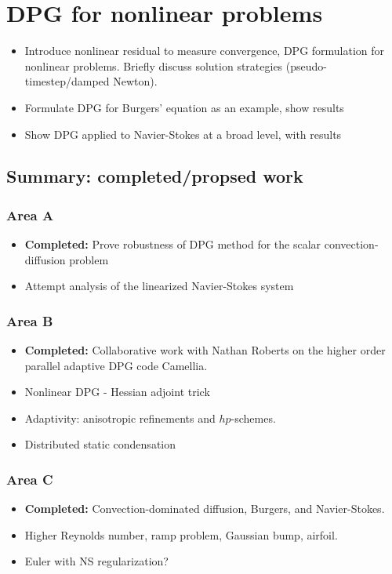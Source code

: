 \documentclass{report}
\begin{document}
\chapter{DPG for nonlinear problems}

\begin{itemize}
\item Introduce nonlinear residual to measure convergence, DPG formulation for nonlinear problems. Briefly discuss solution strategies (pseudo-timestep/damped Newton). 
\item Formulate DPG for Burgers' equation as an example, show results
\item Show DPG applied to Navier-Stokes at a broad level, with results
\end{itemize}

\section{Summary: completed/propsed work}

\subsection{Area A}

\begin{itemize}
\item{\textbf{Completed: }} Prove robustness of DPG method for the scalar convection-diffusion problem
\item Attempt analysis of the linearized Navier-Stokes system
\end{itemize}

\subsection{Area B}

\begin{itemize}
\item{\textbf{Completed: }} Collaborative work with Nathan Roberts on the higher order parallel adaptive DPG code Camellia.
\item Nonlinear DPG - Hessian adjoint trick
\item Adaptivity: anisotropic refinements and $hp$-schemes.
\item Distributed static condensation
\end{itemize}

\subsection{Area C}

\begin{itemize}
\item{\textbf{Completed: }} Convection-dominated diffusion, Burgers, and Navier-Stokes. 
\item Higher Reynolds number, ramp problem, Gaussian bump, airfoil.
\item Euler with NS regularization?
\end{itemize}



\end{document}
